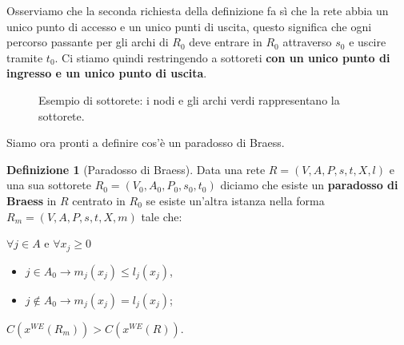 \documentclass[a4paper]{article}
\newcounter{counter1}
\theoremstyle{plain}
\theoremstyle{definition}
\newtheorem{mydef}[counter1]{Definizione}
\theoremstyle{remark}
\newcommand{\pa}[1]{\left(#1\right)}
\begin{document}
Osserviamo che la seconda richiesta della definizione fa sì che la
rete abbia un unico punto di accesso e un unico punti di uscita,
questo significa che ogni percorso passante per gli archi di $R_0$
deve entrare in $R_0$ attraverso $s_0$ e uscire tramite $t_0$. Ci
stiamo quindi restringendo a sottoreti \textbf{con un unico punto di
  ingresso e un unico punto di uscita}.

\begin{figure}[ht]
  \centering
  \caption{Esempio di sottorete: i nodi e gli archi verdi
    rappresentano la sottorete.}
  \label{fig:sottorete}
\end{figure}

Siamo ora pronti a definire cos'è un paradosso di Braess.
\begin{mydef}[Paradosso di Braess]
  Data una rete $R=(V,A,P,s,t,X,l)$ e una sua sottorete
  $R_0=(V_0,A_0,P_0,s_0,t_0)$ diciamo che esiste un
  \textbf{paradosso di Braess} in $R$ centrato in $R_0$ se esiste
  un'altra istanza nella forma $R_m=(V,A,P,s,t,X,m)$ tale che:
  \begin{enumerate}
    \begin{minipage}{1.0\linewidth}
    \item $\forall j\in A$ e $\forall x_j \ge0$
      \begin{itemize}
      \item $j \in A_0 \longrightarrow m_j(x_j) \le l_j(x_j)$,
      \item $j \not\in A_0\longrightarrow m_j(x_j) = l_j(x_j)$;
      \end{itemize}
    \end{minipage}
  \item $C\pa{x^{WE}\pa{R_m}} > C\pa{x^{WE}\pa{R}}$.
  \end{enumerate}
\end{mydef}
\end{document}
